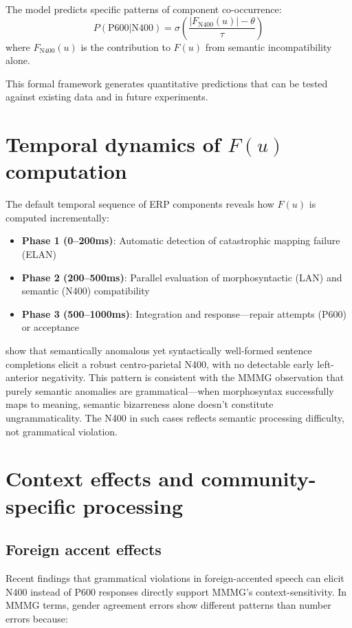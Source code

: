 \documentclass[12pt,letterpaper]{article}
\begin{document}
The model predicts specific patterns of component co-occurrence:
\[
P(\text{P600} | \text{N400}) = \sigma\left(\frac{|F_{\text{N400}}(u)| - \theta}{\tau}\right)
\]
where $F_{\text{N400}}(u)$ is the contribution to $F(u)$ from semantic incompatibility alone.

This formal framework generates quantitative predictions that can be tested against existing data and in future experiments.
\section{Temporal dynamics of \texorpdfstring{$F(u)$}{F(u)} computation}

The default temporal sequence of ERP components reveals how $F(u)$ is computed incrementally:
\begin{itemize}
    \item \textbf{Phase 1 (0--200ms)}: Automatic detection of catastrophic mapping failure (ELAN)
    \item \textbf{Phase 2 (200--500ms)}: Parallel evaluation of morphosyntactic (LAN) and semantic (N400) compatibility
    \item \textbf{Phase 3 (500--1000ms)}: Integration and response---repair attempts (P600) or acceptance
\end{itemize}

\textcite{Wlotko2013} show that semantically anomalous yet syntactically well-formed sentence completions elicit a robust centro-parietal N400, with no detectable early left-anterior negativity. This pattern is consistent with the MMMG observation that purely semantic anomalies are grammatical—when morphosyntax successfully maps to meaning, semantic bizarreness alone doesn't constitute ungrammaticality. The N400 in such cases reflects semantic processing difficulty, not grammatical violation.



\section{Context effects and community-specific processing}
\subsection{Foreign accent effects}
Recent findings that grammatical violations in foreign-accented speech can elicit N400 instead of P600 responses \autocite{Hanulova2018} directly support MMMG's context-sensitivity. In MMMG terms, gender agreement errors show different patterns than number errors because:
\end{document}

